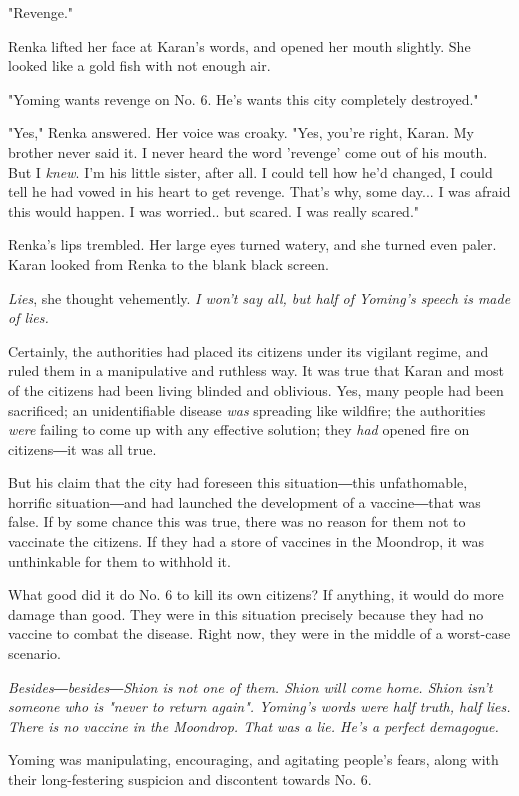 "Revenge."

Renka lifted her face at Karan's words, and opened her mouth slightly.
She looked like a gold fish with not enough air.

"Yoming wants revenge on No. 6. He's wants this city completely
destroyed."

"Yes," Renka answered. Her voice was croaky. "Yes, you're right, Karan.
My brother never said it. I never heard the word 'revenge' come out of
his mouth. But I \emph{knew}. I'm his little sister, after all. I could tell
how he'd changed, I could tell he had vowed in his heart to get revenge.
That's why, some day... I was afraid this would happen. I was worried..
but scared. I was really scared."

Renka's lips trembled. Her large eyes turned watery, and she turned even
paler. Karan looked from Renka to the blank black screen.

\emph{Lies}, she thought vehemently. \emph{I won't say all, but half of Yoming's
speech is made of lies.}

Certainly, the authorities had placed its citizens under its vigilant
regime, and ruled them in a manipulative and ruthless way. It was true
that Karan and most of the citizens had been living blinded and
oblivious. Yes, many people had been sacrificed; an unidentifiable
disease \emph{was} spreading like wildfire; the authorities \emph{were} failing to
come up with any effective solution; they \emph{had} opened fire on citizens―it
was all true.

But his claim that the city had foreseen this situation―this
unfathomable, horrific situation―and had launched the development of a
vaccine―that was false. If by some chance this was true, there was no
reason for them not to vaccinate the citizens. If they had a store of
vaccines in the Moondrop, it was unthinkable for them to withhold it.

What good did it do No. 6 to kill its own citizens? If anything, it
would do more damage than good. They were in this situation precisely
because they had no vaccine to combat the disease. Right now, they were
in the middle of a worst-case scenario.

\emph{Besides―besides―Shion is not one of them. Shion will come home. Shion
isn't someone who is "never to return again". Yoming's words were half
truth, half lies. There is no vaccine in the Moondrop. That was a lie.
He's a perfect demagogue.}

Yoming was manipulating, encouraging, and agitating people's fears,
along with their long-festering suspicion and discontent towards No. 6.

